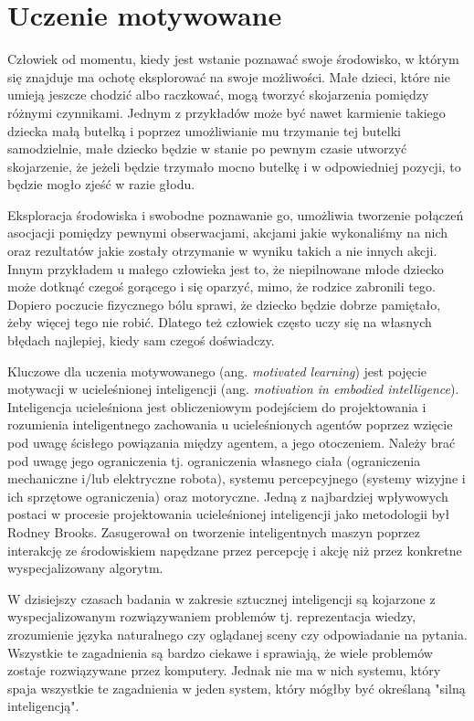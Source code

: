 \chapter{Uczenie motywowane}
\label{cha:rozdzial2}

Człowiek od momentu, kiedy jest wstanie poznawać swoje środowisko, w którym się 
znajduje ma ochotę eksplorować na swoje możliwości. Małe dzieci, które nie 
umieją jeszcze chodzić albo raczkować, mogą tworzyć skojarzenia pomiędzy 
różnymi czynnikami. Jednym z przykładów może być nawet karmienie takiego 
dziecka małą butelką i poprzez umożliwianie mu trzymanie tej butelki 
samodzielnie, małe dziecko będzie w stanie po pewnym czasie utworzyć 
skojarzenie, że jeżeli będzie trzymało mocno butelkę i w odpowiedniej pozycji, 
to będzie mogło zjeść w razie głodu.

Eksploracja środowiska i swobodne poznawanie go, umożliwia tworzenie połączeń 
asocjacji pomiędzy pewnymi obserwacjami, akcjami jakie wykonaliśmy na nich oraz 
rezultatów jakie zostały otrzymanie w wyniku takich a nie innych akcji. Innym 
przykładem u małego człowieka jest to, że niepilnowane młode dziecko może 
dotknąć czegoś gorącego i się oparzyć, mimo, że rodzice zabronili tego. Dopiero 
poczucie fizycznego bólu sprawi, że dziecko będzie dobrze pamiętało, żeby 
więcej tego nie robić. Dlatego też człowiek często uczy się na własnych błędach 
najlepiej, kiedy sam czegoś doświadczy.

Kluczowe dla uczenia motywowanego (ang. \textit{motivated learning}) jest 
pojęcie motywacji w ucieleśnionej inteligencji (ang. \textit{motivation in 
embodied intelligence}). Inteligencja ucieleśniona jest obliczeniowym 
podejściem do projektowania i rozumienia inteligentnego zachowania u 
ucieleśnionych agentów poprzez wzięcie pod uwagę ścisłego powiązania między 
agentem, a jego otoczeniem. Należy brać pod uwagę jego ograniczenia tj. 
ograniczenia własnego ciała (ograniczenia mechaniczne i/lub elektryczne 
robota), systemu percepcyjnego (systemy wizyjne i ich sprzętowe ograniczenia) 
oraz motoryczne. Jedną z najbardziej wpływowych postaci w procesie 
projektowania ucieleśnionej inteligencji jako metodologii był Rodney Brooks. 
Zasugerował on tworzenie inteligentnych maszyn poprzez interakcję ze 
środowiskiem napędzane przez percepcję i akcję niż przez konkretne 
wyspecjalizowany algorytm.

W dzisiejszy czasach badania w zakresie sztucznej inteligencji są kojarzone z 
wyspecjalizowanym rozwiązywaniem problemów tj. reprezentacja wiedzy, 
zrozumienie języka naturalnego czy oglądanej sceny czy odpowiadanie na pytania. 
Wszystkie te zagadnienia są bardzo ciekawe i sprawiają, że wiele problemów 
zostaje rozwiązywane przez komputery. Jednak nie ma w nich systemu, który spaja 
wszystkie te zagadnienia w jeden system, który mógłby być określaną "silną 
inteligencją".

